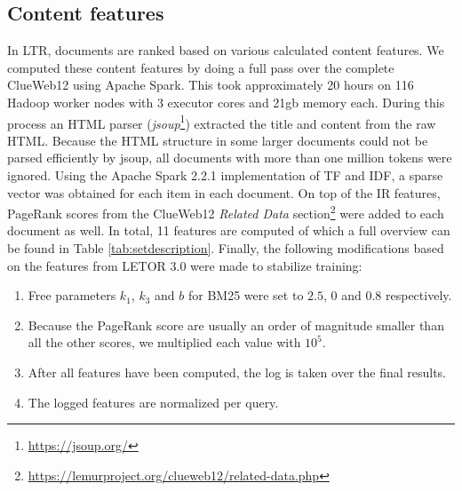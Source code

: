 \subsection{Content features} \label{sec:contentfeature}
In LTR, documents are ranked based on various calculated content features. We computed these content features by doing a full pass over the complete ClueWeb12 using Apache Spark. This took approximately 20 hours on 116 Hadoop worker nodes with 3 executor cores and 21gb memory each. During this process an HTML parser (\textit{jsoup}\footnote{{\url{https://jsoup.org/}}}) extracted the title and content from the raw HTML. Because the HTML structure in some larger documents could not be parsed efficiently by jsoup, all documents with more than one million tokens were ignored. Using the Apache Spark 2.2.1 implementation of TF and IDF, a sparse vector was obtained for each item in each document.  On top of the IR features, PageRank scores from the ClueWeb12 \textit{Related Data} section\footnote{{\url{https://lemurproject.org/clueweb12/related-data.php}}} were added to each document as well. In total, 11 features are computed of which a full overview can be found in Table \ref{tab:setdescription}. Finally, the following modifications based on the features from LETOR 3.0 \cite{qin2010letor} were made to stabilize training:
\begin{enumerate}  
\item Free parameters $k_1$, $k_3$ and $b$ for BM25 were set to $2.5$, $0$ and $0.8$ respectively. 
\item Because the PageRank score are usually an order of magnitude smaller than all the other scores, we multiplied each value with $10^5$.
\item After all features have been computed, the log is taken over the final results.
\item The logged features are normalized per query.  
\end{enumerate}


